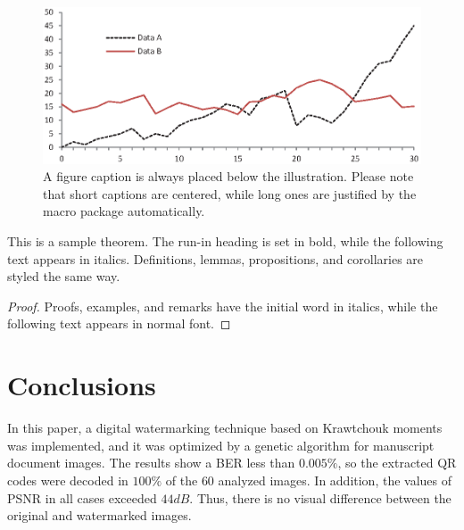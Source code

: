 \documentclass[runningheads]{llncs}
\begin{document}
\begin{figure}
\includegraphics[width=\textwidth]{fig1.eps}
\caption{A figure caption is always placed below the illustration.
Please note that short captions are centered, while long ones are
justified by the macro package automatically.} \label{fig1}
\end{figure}

\begin{theorem}
This is a sample theorem. The run-in heading is set in bold, while
the following text appears in italics. Definitions, lemmas,
propositions, and corollaries are styled the same way.
\end{theorem}
%
%
\begin{proof}
Proofs, examples, and remarks have the initial word in italics,
while the following text appears in normal font.
\end{proof}
\section{Conclusions}
In this paper, a digital watermarking technique based on Krawtchouk moments was implemented, and it was optimized by a genetic algorithm for manuscript document images. The results show a BER less than $0.005 \%$, so the extracted QR codes were decoded in $100\%$ of the $60$ analyzed images. In addition, the values of PSNR in all cases exceeded $44dB$. Thus, there is no visual difference between the original and watermarked images.
%
%
%


%
\end{document}
